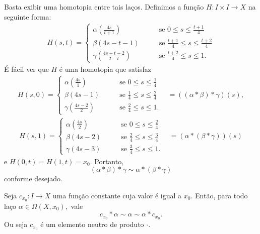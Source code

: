 \begin{dem}
    Basta exibir uma homotopia entre tais laços. Definimos a função $H:I\times I\rightarrow X$ na seguinte forma:
    \begin{align*}
        H(s,t)=\begin{cases}
            \alpha(\frac{4s}{t+1})\;\;\;&\;\;\;\mbox{ se }0\le s \le \frac{t+1}{4}\\
            \beta(4s-t-1)\;\;\;&\;\;\;\mbox{ se }\frac{t+1}{4}\le s\le\frac{t+2}{4}\\
            \gamma(\frac{4s-t-2}{2-t})\;\;\;&\;\;\;\mbox{ se }\frac{t+2}{4}\le s\le 1.
        \end{cases}
    \end{align*}
    É fácil ver que $H$ é uma homotopia que satisfaz
    \begin{align*}
        H(s,0)=\begin{cases}
            \alpha(\frac{4s}{1})\;\;\;&\;\;\;\mbox{ se }0\le s \le \frac{1}{4}\\
            \beta(4s-1)\;\;\;&\;\;\;\mbox{ se }\frac{1}{4}\le s\le\frac{2}{4}\\
            \gamma(\frac{4s-2}{2})\;\;\;&\;\;\;\mbox{ se }\frac{2}{4}\le s\le 1.
        \end{cases}\;\;\;=((\alpha*\beta)*\gamma)(s),
    \end{align*}
    \begin{align*}
        H(s,1)=\begin{cases}
            \alpha(\frac{4s}{2})\;\;\;&\;\;\;\mbox{ se }0\le s \le \frac{2}{4}\\
            \beta(4s-2)\;\;\;&\;\;\;\mbox{ se }\frac{2}{4}\le s\le\frac{3}{4}\\
            \gamma(4s-3)\;\;\;&\;\;\;\mbox{ se }\frac{3}{4}\le s\le 1.
        \end{cases}\;\;\;=(\alpha*(\beta*\gamma))(s)
    \end{align*}
    e $H(0,t)=H(1,t)=x_0.$ Portanto, $$(\alpha*\beta)*\gamma\sim \alpha*(\beta*\gamma)$$ conforme desejado.
\end{dem}

\begin{lemma}
    Seja $c_{x_0}:I\rightarrow X$ uma função constante cuja valor é igual a $x_0.$ Então, para todo laço $\alpha\in \Omega(X,x_0),$ vale
    $$c_{x_0}*\alpha\sim\alpha\sim\alpha*c_{x_0}.$$
    Ou seja $c_{x_0}$ é um elemento neutro de produto $\cdot.$
\end{lemma}

